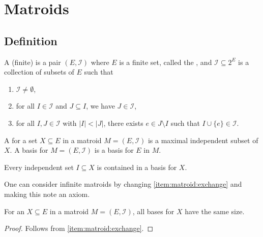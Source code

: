 \chapter{Matroids}

\section{Definition}

\begin{definition}[Matroid]
    A (finite)  is a pair \( (E, \mathcal{I}) \) where
    \(E\) is a finite set, called the , and
    \(\mathcal{I} \subseteq 2^E\) is a collection of subsets of \(E\) such that
    \begin{enumerate}[label = \textup{(I\arabic*)}]
        \item \(\mathcal{I} \neq \emptyset\), \label{item:matroid:nonempty}
        \item for all \(I \in \mathcal{I}\) and \(J \subseteq I\), we have \(J \in \mathcal{I}\), \label{item:matroid:hereditary}
        \item for all \(I, J \in \mathcal{I}\) with \(|I| < |J|\), there exists \(e \in J \setminus I\) such that \(I \cup \{e\} \in \mathcal{I}\). \label{item:matroid:exchange}
    \end{enumerate}
\end{definition}

\begin{definition}[Basis]
    A  for a set \(X \subseteq E\) in a matroid \(M = (E, \mathcal{I})\) is a maximal independent subset of \(X\).
    A basis for \(M = (E, \mathcal{I})\) is a basis for \(E\) in \(M\).
\end{definition}

\begin{note}
    Every independent set \(I \subseteq X\) is contained in a basis for \(X\).
\end{note}
One can consider infinite matroids by changing \ref{item:matroid:exchange} and making this note an axiom.

\begin{proposition}
    For an \(X \subseteq E\) in a matroid \(M = (E, \mathcal{I})\), all bases for \(X\) have the same size.
\end{proposition}

\begin{proof}
    Follows from \ref{item:matroid:exchange}.
\end{proof}

